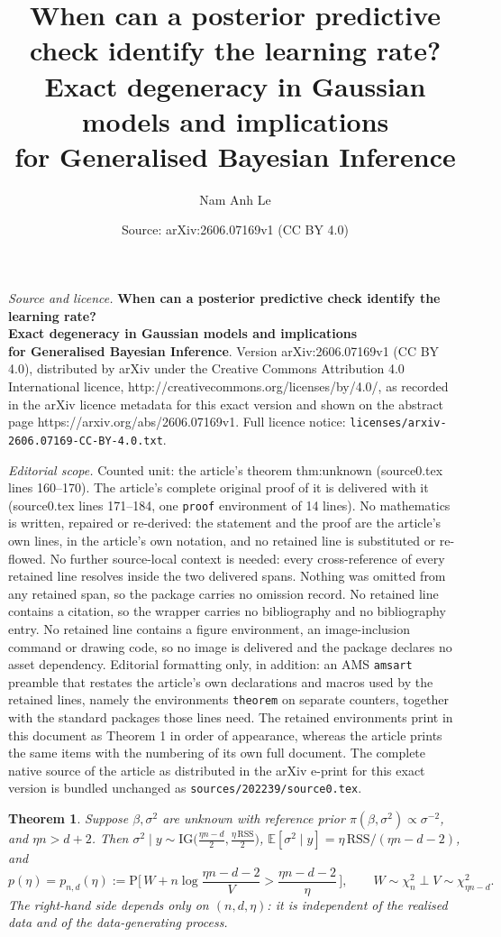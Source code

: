 \documentclass[10pt,a4paper]{amsart}
\title{\textbf{When can a posterior predictive check identify the learning rate?\\[0.25em] Exact degeneracy in Gaussian models and implications\\ for Generalised Bayesian Inference}}
\author{Nam Anh Le}
\date{Source: arXiv:2606.07169v1 (CC BY 4.0)}
\newtheorem{theorem}{Theorem}
\newcommand{\E}{\mathbb{E}}
\newcommand{\IG}{\mathrm{IG}}
\newcommand{\Prob}{\mathrm{P}}
\newcommand{\RSS}{\mathrm{RSS}}
\newcommand{\bbeta}{\beta}
\newcommand{\chisq}{\chi^2}
\begin{document}
\maketitle

\noindent\emph{Source and licence.} \textbf{When can a posterior predictive check identify the learning rate?\\[0.25em] Exact degeneracy in Gaussian models and implications\\ for Generalised Bayesian Inference}. Version arXiv:2606.07169v1 (CC BY 4.0), distributed by arXiv under the Creative Commons Attribution 4.0 International licence, http://creativecommons.org/licenses/by/4.0/, as recorded in the arXiv licence metadata for this exact version and shown on the abstract page https://arxiv.org/abs/2606.07169v1. Full licence notice: \texttt{licenses/arxiv-2606.07169-CC-BY-4.0.txt}.\par\smallskip

\noindent\textit{Editorial scope.} Counted unit: the article's theorem thm:unknown (source0.tex lines 160--170). The article's complete original proof of it is delivered with it (source0.tex lines 171--184, one \texttt{proof} environment of 14 lines). No mathematics is written, repaired or re-derived: the statement and the proof are the article's own lines, in the article's own notation, and no retained line is substituted or re-flowed.  No further source-local context is needed: every cross-reference of every retained line resolves inside the two delivered spans.  Nothing was omitted from any retained span, so the package carries no omission record.  No retained line contains a citation, so the wrapper carries no bibliography and no bibliography entry.  No retained line contains a figure environment, an image-inclusion command or drawing code, so no image is delivered and the package declares no asset dependency.  Editorial formatting only, in addition: an AMS \texttt{amsart} preamble that restates the article's own declarations and macros used by the retained lines, namely the environments \texttt{theorem} on separate counters, together with the standard packages those lines need.  The retained environments print in this document as Theorem 1 in order of appearance, whereas the article prints the same items with the numbering of its own full document.  The complete native source of the article as distributed in the arXiv e-print for this exact version is bundled unchanged as \texttt{sources/202239/source0.tex}.
\begin{theorem}\label{thm:unknown}
Suppose $\bbeta,\sigma^2$ are unknown with reference prior $\pi(\bbeta,\sigma^2)\propto\sigma^{-2}$, and
$\eta n>d+2$. Then $\sigma^2\mid y\sim\IG\!\big(\tfrac{\eta n-d}{2},\tfrac{\eta\,\RSS}{2}\big)$,
$\E[\sigma^2\mid y]=\eta\,\RSS/(\eta n-d-2)$, and
\begin{equation}\label{eq:law}
p(\eta)=p_{n,d}(\eta):=\Prob\!\Big[\,W+n\log\frac{\eta n-d-2}{V}>\frac{\eta n-d-2}{\eta}\,\Big],
\qquad W\sim\chisq_n \perp V\sim\chisq_{\eta n-d}.
\end{equation}
The right-hand side depends only on $(n,d,\eta)$: it is independent of the realised data and of the
data-generating process.
\end{theorem}
\end{document}

